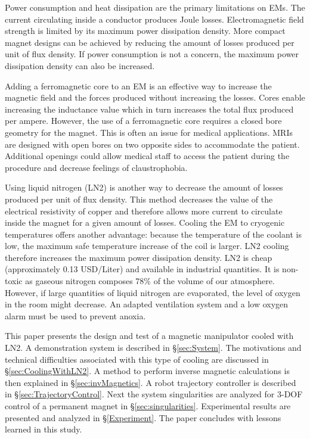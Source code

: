  Power consumption and heat dissipation are the primary limitations on EMs. 
 The current circulating inside a conductor produces Joule losses.
 Electromagnetic field strength is limited by its maximum power dissipation density. 
  More compact magnet designs can be achieved by reducing the amount of losses produced per unit of flux density. 
  If power consumption is not a concern, the maximum power dissipation density can also be increased.\par
Adding a ferromagnetic core to an EM is an effective way to increase the magnetic field and the forces produced without increasing the losses.
 Cores enable increasing the inductance value which in turn increases the total flux produced per ampere. 
 However, the use of a ferromagnetic core requires a closed bore geometry for the magnet. 
 This is often an issue for medical applications. 
  MRIs are designed with open bores on two opposite sides to accommodate the patient. 
 Additional openings could allow medical staff to access the patient during the procedure and decrease feelings of claustrophobia.\par    
Using liquid nitrogen (LN2) is another way to decrease the amount of losses produced per unit of flux density. 
This method decreases the value of the electrical resistivity of copper and therefore allows more current to circulate inside the magnet for a given amount of losses. 
Cooling the EM to cryogenic temperatures offers another advantage: because the temperature of the coolant is low, the maximum safe temperature increase of the coil is larger. 
LN2 cooling therefore increases the maximum power dissipation density. 
LN2 is cheap (approximately 0.13 USD/Liter) and available in industrial quantities. 
It is non-toxic as gaseous nitrogen composes 78\% of the volume of our atmosphere. However, if large quantities of liquid nitrogen are evaporated, the level of oxygen in the room might decrease. An adapted ventilation system and a low oxygen alarm must be used to prevent anoxia. \par
This paper presents the design and test of a magnetic manipulator cooled with LN2. 
A demonstration system is described in \S\ref{sec:System}.
The motivations and technical difficulties associated with this type of cooling are discussed in \S\ref{sec:CoolingWithLN2}.
A method to perform inverse magnetic calculations is then explained in \S\ref{sec:invMagnetics}.
 A robot trajectory controller is described in \S\ref{sec:TrajectoryControl}. 
 Next the system singularities are analyzed for 3-DOF control of a permanent magnet in \S\ref{sec:singularities}. 
  Experimental results are presented and analyzed in \S\ref{Experiment}. The paper concludes with lessons learned in this study.\par

